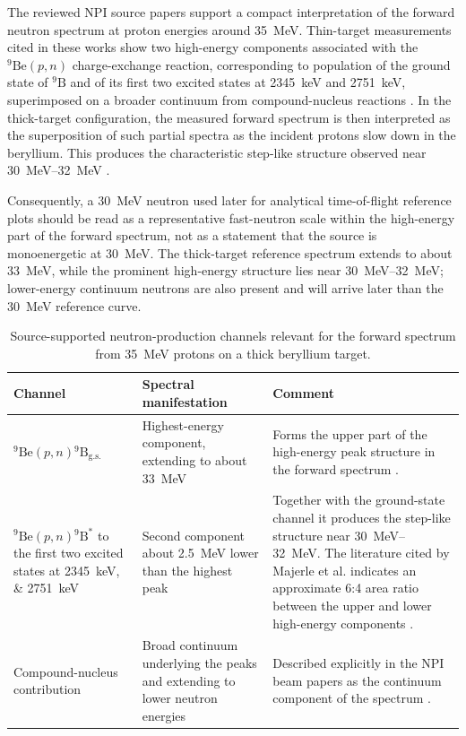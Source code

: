 The reviewed NPI source papers support a compact interpretation of the forward neutron spectrum at proton energies around \SI{35}{MeV}. Thin-target measurements cited in these works show two high-energy components associated with the \(^{9}\mathrm{Be}(p,n)\) charge-exchange reaction, corresponding to population of the ground state of \(^{9}\mathrm{B}\) and of its first two excited states at \SI{2345}{keV} and \SI{2751}{keV}, superimposed on a broader continuum from compound-nucleus reactions \citep{Majerle2023PBeGenerator,Ansorge2025CollimatedBeams}. In the thick-target configuration, the measured forward spectrum is then interpreted as the superposition of such partial spectra as the incident protons slow down in the beryllium. This produces the characteristic step-like structure observed near \SIrange{30}{32}{MeV} \citep{Majerle2023PBeGenerator}.

Consequently, a \SI{30}{MeV} neutron used later for analytical time-of-flight reference plots should be read as a representative fast-neutron scale within the high-energy part of the forward spectrum, not as a statement that the source is monoenergetic at \SI{30}{MeV}. The thick-target reference spectrum extends to about \SI{33}{MeV}, while the prominent high-energy structure lies near \SIrange{30}{32}{MeV}; lower-energy continuum neutrons are also present and will arrive later than the \SI{30}{MeV} reference curve.

\begin{table}[htbp]
\centering
\caption{Source-supported neutron-production channels relevant for the forward spectrum from \SI{35}{MeV} protons on a thick beryllium target.}
\begin{tabular}{p{3.8cm}p{3.1cm}p{5.7cm}}
\toprule
Channel & Spectral manifestation & Comment \\
\midrule
\(^{9}\mathrm{Be}(p,n){}^{9}\mathrm{B}_{\mathrm{g.s.}}\) & Highest-energy component, extending to about \SI{33}{MeV} & Forms the upper part of the high-energy peak structure in the forward spectrum \citep{Majerle2023PBeGenerator}. \\
\(^{9}\mathrm{Be}(p,n){}^{9}\mathrm{B}^{*}\) to the first two excited states at \SIlist{2345;2751}{keV} & Second component about \SI{2.5}{MeV} lower than the highest peak & Together with the ground-state channel it produces the step-like structure near \SIrange{30}{32}{MeV}. The literature cited by Majerle et al. indicates an approximate 6:4 area ratio between the upper and lower high-energy components \citep{Majerle2023PBeGenerator}. \\
Compound-nucleus contribution & Broad continuum underlying the peaks and extending to lower neutron energies & Described explicitly in the NPI beam papers as the continuum component of the spectrum \citep{Majerle2023PBeGenerator,Ansorge2025CollimatedBeams}. \\
\bottomrule
\end{tabular}
\end{table}

